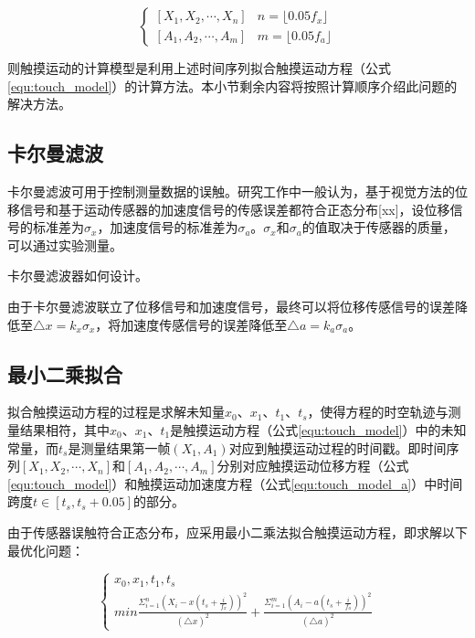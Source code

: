 \begin{equation}
\begin{cases}
[X_1, X_2, \cdots, X_n]& n=\lfloor0.05f_x\rfloor \\
[A_1, A_2, \cdots, A_m]& m=\lfloor0.05f_a\rfloor
\end{cases}
\end{equation}

则触摸运动的计算模型是利用上述时间序列拟合触摸运动方程（公式\ref{equ:touch_model}）的计算方法。本小节剩余内容将按照计算顺序介绍此问题的解决方法。

\subsection{卡尔曼滤波}

卡尔曼滤波可用于控制测量数据的误触。研究工作中一般认为，基于视觉方法的位移信号和基于运动传感器的加速度信号的传感误差都符合正态分布[xx]，设位移信号的标准差为$\sigma_x$，加速度信号的标准差为$\sigma_a$。$\sigma_x$和$\sigma_a$的值取决于传感器的质量，可以通过实验测量。

卡尔曼滤波器如何设计。

由于卡尔曼滤波联立了位移信号和加速度信号，最终可以将位移传感信号的误差降低至$\bigtriangleup x=k_x\sigma_x$，将加速度传感信号的误差降低至$\bigtriangleup a=k_a\sigma_a$。

\subsection{最小二乘拟合}

拟合触摸运动方程的过程是求解未知量$x_0$、$x_1$、$t_1$、$t_s$，使得方程的时空轨迹与测量结果相符，其中$x_0$、$x_1$、$t_1$是触摸运动方程（公式\ref{equ:touch_model}）中的未知常量，而$t_s$是测量结果第一帧$(X_1,A_1)$对应到触摸运动过程的时间戳。即时间序列$[X_1, X_2, \cdots, X_n]$和$[A_1, A_2, \cdots, A_m]$分别对应触摸运动位移方程（公式\ref{equ:touch_model}）和触摸运动加速度方程（公式\ref{equ:touch_model_a}）中时间跨度$t\in [t_s,t_s+0.05]$的部分。

由于传感器误触符合正态分布，应采用最小二乘法拟合触摸运动方程，即求解以下最优化问题：

\begin{equation}
\begin{cases}
x_0, x_1, t_1, t_s \\
min \frac{\Sigma^n_{i=1}{\left(X_i-x(t_s+\frac{i}{f_x})\right)^2}}{(\bigtriangleup x)^2}
+ \frac{\Sigma^m_{i=1}{\left(A_i-a(t_s+\frac{i}{f_a})\right)^2}}{(\bigtriangleup a)^2}
\end{cases}
\end{equation}

